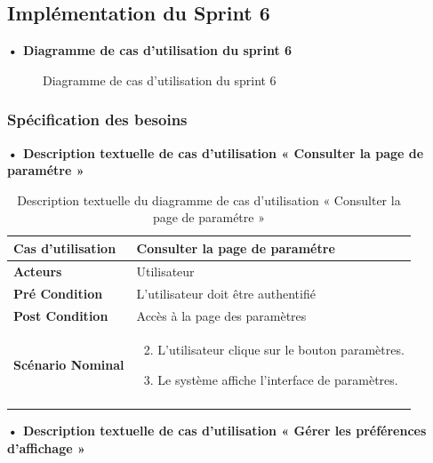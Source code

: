 \subsection{Implémentation du Sprint 6}
\textbf{•	Diagramme de cas d'utilisation du sprint 6}

\begin{figure}[H]
  \centering
  \caption{Diagramme de cas d'utilisation du sprint 6}
  \label{fig:UseCaseDiagramSp61}
\end{figure}


\subsubsection{Spécification des besoins}

\textbf{•	Description textuelle de cas d'utilisation « Consulter la page de paramétre  »}

\begin{longtable}{|p{5cm}|p{10cm}|}
\hline
\textbf{Cas d'utilisation}&Consulter la page de paramétre\\
\hline
\textbf{Acteurs}&Utilisateur\\
\hline
\textbf{Pré Condition}&L'utilisateur doit être authentifié\\
\hline
\textbf{Post Condition}&Accès à la page des paramètres\\
\hline
\textbf{Scénario Nominal}&
\vspace{-\baselineskip}
\begin{enumerate}
  \setcounter{enumi}{1}
    \item L'utilisateur clique sur le bouton paramètres.
    \item Le système affiche l'interface de paramètres.
\end{enumerate}\\
\hline
\caption{Description textuelle du diagramme de cas d'utilisation « Consulter la page de paramétre »}
\label{tab:use_case_consult_settings_page}
\end{longtable}


\textbf{•	Description textuelle de cas d'utilisation « Gérer les préférences d'affichage   »}

